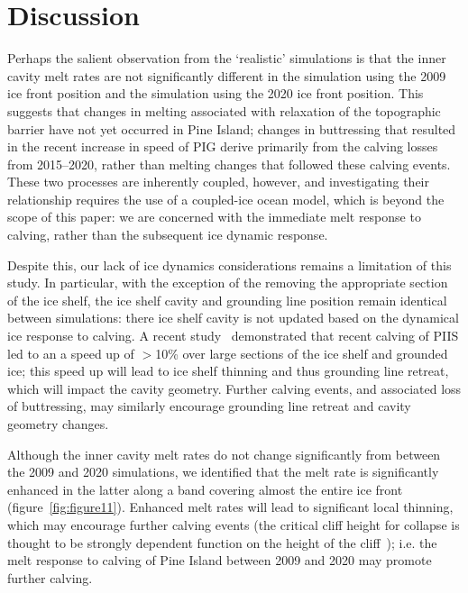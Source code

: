 \documentclass[draft]{agujournal2019}
\begin{document}
\section{Discussion}\label{S:Discussion}

Perhaps the salient observation from the `realistic' simulations is that the inner cavity melt rates are not significantly different in the simulation using the 2009 ice front position and the simulation using the 2020 ice front position. This suggests that changes in melting associated with relaxation of the topographic barrier have not yet occurred in Pine Island; changes in buttressing that resulted in the recent increase in speed of PIG \cite{Joughin2021ScienceAdv} derive primarily from the calving losses from 2015--2020, rather than melting changes that followed these calving events. These two processes are inherently coupled, however, and investigating their relationship requires the use of a coupled-ice ocean model, which is beyond the scope of this paper: we are concerned with the immediate melt response to calving, rather than the subsequent ice dynamic response. 

Despite this, our lack of ice dynamics considerations remains a limitation of this study. In particular, with the exception of the removing the appropriate section of the ice shelf, the ice shelf cavity and grounding line position remain identical between simulations: there ice shelf cavity is not updated based on the dynamical ice response to calving. A recent study~\cite{Joughin2021ScienceAdv} demonstrated that recent calving of PIIS led to an a speed up of $>$10\% over large sections of the ice shelf and grounded ice; this speed up will lead to ice shelf thinning and thus grounding line retreat, which will impact the cavity geometry. Further calving events, and associated loss of buttressing, may similarly encourage grounding line retreat and cavity geometry changes. 

Although the inner cavity melt rates do not change significantly from between the 2009 and 2020 simulations, we identified  that the melt rate is significantly enhanced in the latter along a band covering almost the entire ice front (figure~\ref{fig:figure11}). Enhanced melt rates will lead to significant local thinning, which may encourage further calving events (the critical cliff height for collapse is thought to be strongly dependent function on the height of the cliff~\cite[ for example]{Crawford2021NatureComms}); i.e. the melt response to calving of Pine Island between 2009 and 2020 may promote further calving. 
\end{document}
